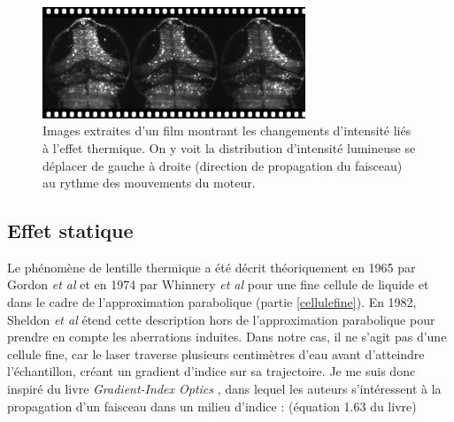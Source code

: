 
\begin{figure}
\centering
\includegraphics[width=0.7\textwidth]{./files/water_instability.svg.png}
\caption{Images extraites d'un film montrant les changements d'intensité liés à l'effet thermique. On y voit la distribution d'intensité lumineuse se déplacer de gauche à droite (direction de propagation du faisceau) au rythme des mouvements du moteur.
\label{FIGwaterinstability}}
\end{figure}




\subsection{Effet statique}


Le phénomène de lentille thermique a été décrit théoriquement en 1965 par Gordon \emph{et al} \cite{gordon_longtransient_1965} et en 1974 par Whinnery \emph{et al} \cite{whinnery_laser_1974} pour une fine cellule de liquide et dans le cadre de l'approximation parabolique (partie \ref{cellulefine}). En 1982, Sheldon \emph{et al} \cite{sheldon_laser-induced_1982} étend cette description hors de l'approximation parabolique pour prendre en compte les aberrations induites. Dans notre cas, il ne s'agit pas d'une cellule fine, car le laser traverse plusieurs centimètres d'eau avant d'atteindre l'échantillon, créant un gradient d'indice sur sa trajectoire. Je me suis donc inspiré du livre \emph{Gradient-Index Optics} \cite{gomez-reino_gradient-index_2002}, dans lequel les auteurs s'intéressent à la propagation d'un faisceau dans un milieu d'indice : (équation 1.63 du livre)

